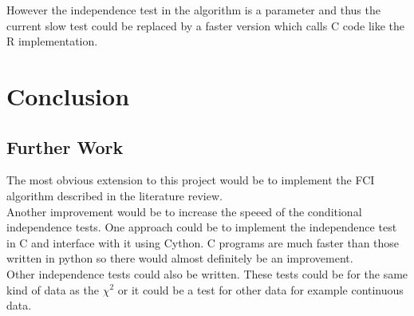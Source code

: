 \documentclass{article}
\begin{document}
However the independence test in the algorithm is a parameter and thus the current slow test could be replaced by a faster version which calls C code like the R implementation.\\ 
\section{Conclusion}
\subsection{Further Work}
The most obvious extension to this project would be to implement the FCI algorithm described in the literature review.\\

Another improvement would be to increase the speeed of the conditional independence tests. One approach could be to implement the independence test in C and interface with it using Cython. C programs are much faster than those written in python so there would almost definitely be an improvement.\\

Other independence tests could also be written. These tests could be for the same kind of data as the $\chi^2$ or it could be a test for other data for example continuous data.\\
{}

\end{document}
